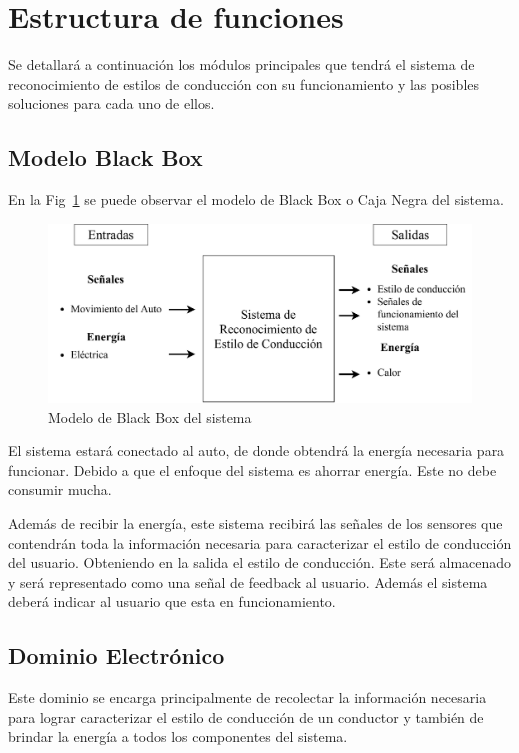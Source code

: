 \egroup

\newpage

\section{Estructura de funciones}
Se detallará a continuación los módulos principales que tendrá el sistema de reconocimiento de estilos de conducción con su funcionamiento y las posibles soluciones para cada uno de ellos.

\subsection{Modelo Black Box}
En la Fig~\ref{fig:3.1} se puede observar el modelo de Black Box o Caja Negra del sistema.

\begin{figure}[htbp!]
\centering
\includegraphics[width=\textwidth]{Fig1}
\caption{Modelo de Black Box del sistema}
\label{fig:3.1}
\end{figure}


El sistema estará conectado al auto, de donde obtendrá la energía necesaria para funcionar. Debido a que el enfoque del sistema es ahorrar energía. Este no debe consumir mucha.

Además de recibir la energía, este sistema recibirá las señales de los sensores que contendrán toda la información necesaria para caracterizar el estilo de conducción del usuario. Obteniendo en la salida el estilo de conducción. Este será almacenado y será representado como una señal de feedback al usuario. Además el sistema deberá indicar al usuario que esta en funcionamiento.

\subsection{Dominio Electrónico}

Este dominio se encarga principalmente de recolectar la información necesaria para lograr caracterizar el estilo de conducción de un conductor y también de brindar la energía a todos los componentes del sistema.

